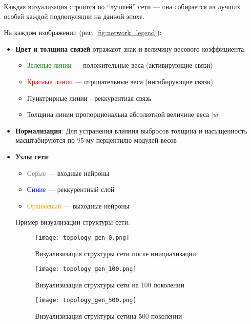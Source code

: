 \documentclass[a4paper,12pt]{article}
\begin{document}
Каждая визуализация строится по ``лучшей'' сети --- она собирается из лучших особей каждой подпопуляции на данной эпохе.


На каждом изображении (рис. \ref{fig:network_legend}):
\begin{itemize}
	\item \textbf{Цвет и толщина связей} отражают знак и величину весового коэффициента:
	\begin{itemize}
		\item \textcolor{green}{Зеленые линии} --- положительные веса (активирующие связи)
		\item \textcolor{red}{Красные линии} --- отрицательные веса (ингибирующие связи)
        \item Пунктрирные линии - реккурентная связь
		\item Толщина линии пропорциональна абсолютной величине веса $|w|$
	\end{itemize}
	\item \textbf{Нормализация}: Для устранения влияния выбросов толщина и насыщенность масштабируются по 95-му перцентилю модулей весов
	\item \textbf{Узлы сети}:
	\begin{itemize}
		\item \textcolor{gray}{Серые} --- входные нейроны
		\item \textcolor{blue}{Синие} --- реккурентный слой
		\item \textcolor{orange}{Оранжевый} --- выходные нейроны
	\end{itemize}


Пример визуализации структуры сети:


\begin{figure}[H]
	\centering
	\texttt{[image: topology\_gen\_0.png]}
	\caption{Визуализизация структуры сети после инициализации}
	\label{fig:test_results}
\end{figure}


\begin{figure}[H]
	\centering
	\texttt{[image: topology\_gen\_100.png]}
	\caption{Визуализизация структуры сети на 100 поколении}
	\label{fig:test_results}
\end{figure}

\begin{figure}[H]
	\centering
	\texttt{[image: topology\_gen\_500.png]}
	\caption{Визуализизация структуры сетина 500 поколении}
	\label{fig:test_results}
\end{figure}


\end{itemize}
\end{document}
